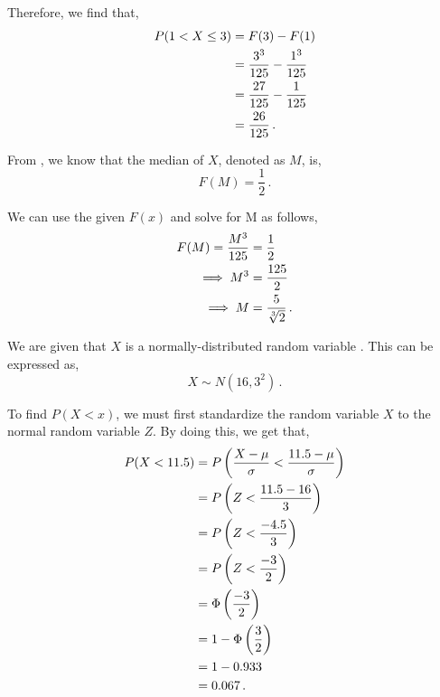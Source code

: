 \begin{subquestions}
\begin{subsubquestions}
Therefore, we find that,
\begin{align}
	P( 1 < X \leq 3) & = F(3) - F(1) \nonumber \\
	                 & = \frac{3^3}{125} - \frac{1^3}{125} \nonumber \\
	                 & = \frac{27}{125} - \frac{1}{125} \nonumber \\
	                 & = \frac{26}{125} \,.
\end{align}


\subsubquestion

From , we know that the median of $X$, denoted as $M$, is,
\begin{equation}
	F(M) = \frac{1}{2} \,.
\end{equation}

We can use the given $F(x)$ and solve for M as follows,
\begin{align}
	F(M) = \frac{M^3}{125} & = \frac{1}{2} \nonumber \\
	        \implies M^3 & = \frac{125}{2} \nonumber \\
	        \implies M & = \frac{5}{\sqrt[3]{2}} \,.
\end{align}

\end{subsubquestions}
	
	
\subquestion

We are given that $X$ is a normally-distributed random variable . This can be expressed as,
\begin{equation}
	X \sim N(16, 3^2) \,.
\end{equation}

\begin{subsubquestions}
	
\subsubquestion

To find $P(X<x)$, we must first standardize the random variable $X$ to the normal random variable $Z$. By doing this, we get that,
\begin{align}
	P(X<11.5) & = P\left(\frac{X- \mu}{\sigma} < \frac{11.5- \mu}{\sigma}\right) \nonumber \\
	          & = P\left(Z < \frac{11.5- 16}{3}\right) \nonumber \\
	          & = P\left(Z < \frac{-4.5}{3}\right) \nonumber \\
	          & = P\left(Z < \frac{-3}{2}\right) \nonumber \\
	          & = \Phi\left(\frac{-3}{2}\right) \nonumber \\
	          & = 1 - \Phi\left(\frac{3}{2} \right) \nonumber \\
	          & = 1 - 0.933 \nonumber \\
	          & = 0.067 \,.
\end{align}


\end{subsubquestions}
\end{subquestions}
